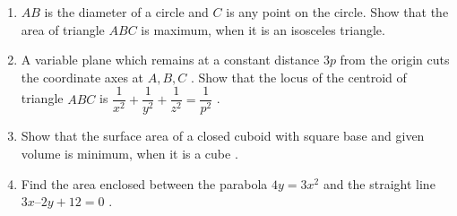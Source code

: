 \begin{enumerate}
\item $AB$ is the diameter of a circle and $C$ is any point on the circle. Show that the area of triangle $ABC$ is maximum, when it is an isosceles triangle.
\item A variable plane which remains at a constant distance $3p$ from the origin cuts the coordinate axes at $A, B, C$ . Show that the locus of the centroid of triangle $ABC$ is $\dfrac{1}{x^2} + \dfrac{1}{y^2} + \dfrac{1}{z^2} = \dfrac{1}{p^2}$ .

\item Show that the surface area of a closed cuboid with square base and given volume is minimum, when it is a cube .
\item Find the area enclosed between the parabola $4y = 3x^2$ and the straight line $3x – 2y + 12 = 0$ .


\end{enumerate}
